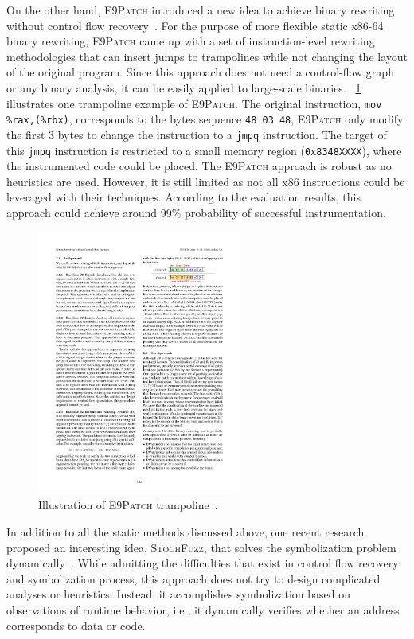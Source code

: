 On the other hand, \textsc{E9Patch} introduced a new idea to achieve binary 
rewriting without control flow recovery~\cite{duck2020binary}. For the purpose 
of more flexible static x86-64 binary rewriting, \textsc{E9Patch} came up with 
a set of instruction-level rewriting methodologies that can insert jumps to 
trampolines while not changing the layout of the original program. Since this 
approach does not need a control-flow graph or any binary analysis, it can be 
easily applied to large-scale binaries.
%
\F~\ref{fig:e9patch} illustrates one trampoline example of \textsc{E9Patch}. 
The original instruction, \texttt{mov \%rax,(\%rbx)}, corresponds to the bytes 
sequence \texttt{48 03 48}, \textsc{E9Patch} only modify the first 3 bytes to 
change the instruction to a \texttt{jmpq} instruction. The target of this 
\texttt{jmpq} instruction is restricted to a small memory region (\texttt
{0x8348XXXX}), where the instrumented code could be placed. The \textsc
{E9Patch} approach is robust as no heuristics are used. However, it is still 
limited as not all x86 instructions could be leveraged with their techniques. 
According to the evaluation results, this approach could achieve around 99\% 
probability of successful instrumentation.

\begin{figure}[tb]
  \centering
  \includegraphics[width=0.6\textwidth]{fig/E9Patch.pdf}
  \caption{Illustration of \textsc{E9Patch} trampoline~\cite{duck2020binary}.}
  \label{fig:e9patch}
\end{figure}

In addition to all the static methods discussed above, one recent research 
proposed an interesting idea, \textsc{StochFuzz}, that solves the symbolization 
problem dynamically~\cite{zhang2021stochfuzz}. While admitting the difficulties 
that exist in control flow recovery and symbolization process, this approach 
does not try to design complicated analyses or heuristics. Instead, it 
accomplishes symbolization based on observations of runtime behavior, i.e., it 
dynamically verifies whether an address corresponds to data or code.

